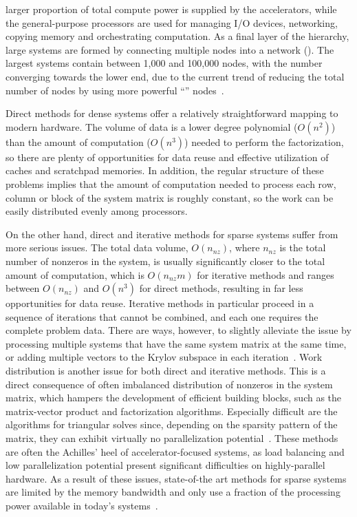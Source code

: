 larger proportion of total compute power is supplied by the accelerators, while
the general-purpose processors are used for managing I/O devices, networking,
copying memory and orchestrating computation. As a final layer of the hierarchy,
large systems are formed by connecting multiple nodes into a network
(). The largest systems contain between 1,000 and 100,000
nodes,
with the number converging towards the lower end, due to the current trend of
reducing the total number of nodes by using more powerful ``''
nodes~\cite{top500}.

Direct methods for dense systems offer a relatively straightforward mapping to
modern hardware. The volume of data is a lower degree polynomial
($O(n^2)$) than the amount of computation ($O(n^3)$) needed to perform the
factorization, so there are plenty of opportunities for data reuse and effective
utilization of caches and scratchpad memories. In addition, the regular
structure of these problems implies that the amount of computation needed to
process each row, column or block of the system matrix is roughly constant, so
the work can be easily distributed evenly among processors.

On the other hand, direct and iterative methods for sparse systems suffer from
more serious issues. The total data volume, $O(n_{nz})$, where $n_{nz}$ is
the total number of nonzeros in the system, is usually significantly closer to
the total amount of computation, which is $O(n_{nz} m)$ for iterative
methods and ranges between $O(n_{nz})$ and $O(n^3)$ for direct methods,
resulting in far less opportunities for data reuse. Iterative methods in
particular proceed in a sequence of iterations that cannot be combined, and each
one requires the complete problem data. There are ways, however, to slightly
alleviate the issue by processing multiple systems that have the same system
matrix at the same time, or adding multiple vectors to the Krylov subspace in
each iteration~\cite{ca-gmres}. Work distribution is another issue for both
direct and iterative methods. This is a direct consequence of often imbalanced
distribution of nonzeros in the system matrix, which hampers the development of
efficient building blocks, such as the matrix-vector product and factorization
algorithms. Especially difficult are the algorithms for triangular solves since,
depending on the sparsity pattern of the matrix, they can exhibit virtually no
parallelization potential~\cite{triangular-solves}. These methods are often the
Achilles' heel of accelerator-focused systems, as load balancing and low
parallelization potential present significant difficulties on highly-parallel
hardware.  As a result of these issues, state-of-the art methods for sparse
systems are limited by the memory bandwidth and only use a fraction of the
processing power available in today's systems~\cite{top500}.
